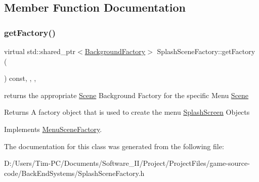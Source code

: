 \subsection{Member Function Documentation}
\mbox{\label{class_splash_scene_factory_a08e3da2eb18122670b40c3520462db51}} 
\subsubsection{\texorpdfstring{get\+Factory()}{getFactory()}}
{\footnotesize\ttfamily virtual std\+::shared\+\_\+ptr$<$\hyperlink{class_background_factory}{Background\+Factory}$>$ Splash\+Scene\+Factory\+::get\+Factory (\begin{DoxyParamCaption}{ }\end{DoxyParamCaption}) const\hspace{0.3cm}{\ttfamily [inline]}, {\ttfamily [override]}, {\ttfamily [protected]}, {\ttfamily [virtual]}}



returns the appropriate \hyperlink{class_scene}{Scene} Background Factory for the specific Menu \hyperlink{class_scene}{Scene} 

\begin{DoxyReturn}{Returns}
A factory object that is used to create the menu \hyperlink{class_splash_screen}{Splash\+Screen} Objects 
\end{DoxyReturn}


Implements \hyperlink{class_menu_scene_factory_ad0f60a16fdbb10c6d7ba3311dafa2e76}{Menu\+Scene\+Factory}.



The documentation for this class was generated from the following file\+:\begin{DoxyCompactItemize}
\item 
D\+:/\+Users/\+Tim-\/\+P\+C/\+Documents/\+Software\+\_\+\+I\+I/\+Project/\+Project\+Files/game-\/source-\/code/\+Back\+End\+Systems/Splash\+Scene\+Factory.\+h\end{DoxyCompactItemize}

